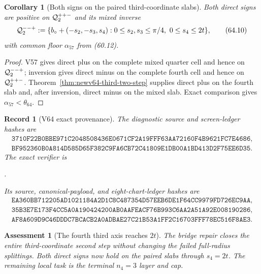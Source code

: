 \documentclass[11pt,oneside]{article}
\newtheorem{corollary}[theorem]{Corollary}
\newtheorem{assessment}[theorem]{Assessment}
\newtheorem{record}[theorem]{Record}
\theoremstyle{definition}
\theoremstyle{remark}
\begin{document}
\begin{corollary}[Both signs on the paired third-coordinate slabs]
\label{cor:newv64-paired-slabs}
Both direct signs are positive on \({\cal Q}^{++-}_{2}\) and its
mixed inverse
\[
 {\cal Q}^{--+}_{2}:=
 \{b_\circ+(-s_2,-s_3,s_4):
 0\le s_2,s_3\le\pi/4,\ 0\le s_4\le2t\},             \tag{64.10}
\]
with common floor \(\alpha_{57}\) from (60.12).
\end{corollary}

\begin{proof}
V57 gives direct plus on the complete mixed quarter cell and hence
on \({\cal Q}^{--+}_{2}\); inversion gives direct minus on the
complete fourth cell and hence on \({\cal Q}^{++-}_{2}\).
Theorem~\ref{thm:newv64-third-two-step} supplies direct plus on the
fourth slab and, after inversion, direct minus on the mixed slab.
Exact comparison gives \(\alpha_{57}<\theta_{64}\).
\end{proof}

\begin{record}[V64 exact provenance]
\label{rec:newv64-provenance}
The diagnostic source and screen-ledger hashes are
\[
\begin{gathered}
\texttt{3710F22B0BBE971C2048508436E0671CF2A19FFF63AA72160F4B9621FC7E4686},\\
\texttt{BF952360B0A814D585D65F382C9FA6CB72C41809E1DB00A1BD413D2F75EE6D35}.
\end{gathered}                                        \tag{64.11}
\]
The exact verifier is
\begin{center}
\footnotesize
{}.
\end{center}
Its source, canonical-payload, and eight-chart-ledger hashes are
\[
\begin{gathered}
\texttt{EA360BB712205AD1021184A2D1C8C487354D57EEB6DE1F64CC9979FD726EC9AA},\\
\texttt{35B3E7E173F4CC5A0A190424200AB0AAFEACF76B993C6AA2A51A92E008190286},\\
\texttt{AF8A609D9C46DDDC7BCACB2A0ADBAE27C21B53A1FF2C16703FFF78EC516F8AE3}.
\end{gathered}                                        \tag{64.12}
\]
\end{record}

\begin{assessment}[The fourth third axis reaches \(2t\)]
\label{ass:newv64}
The bridge repair closes the entire third-coordinate second step
without changing the failed full-radius splittings.  Both direct
signs now hold on the paired slabs through \(s_4=2t\).  The
remaining local task is the terminal \(n_4=3\) layer and cap.
\end{assessment}
\end{document}
